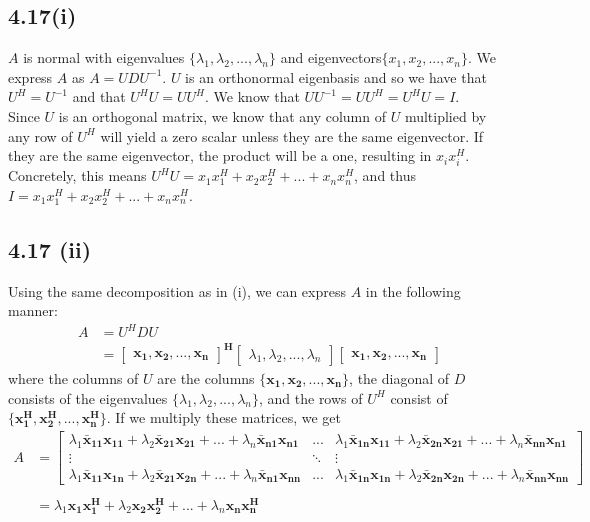 \documentclass[letterpaper,12pt]{article}
\theoremstyle{definition}
\begin{document}
\subsection*{4.17(i)}
$A$ is normal with eigenvalues $\{\lambda_{1},\lambda_{2},...,\lambda_{n}\}$ and eigenvectors$\{x_{1}, x_{2},..., x_{n}\}$. We express $A$ as $A = UDU^{-1}$. $U$ is an orthonormal eigenbasis and so we have that $U^{H}=U^{-1}$ and that $U^{H}U = UU^{H}$. We know that $UU^{-1} = UU^{H} =  U^{H}U = I$. \\
Since $U$ is an orthogonal matrix, we know that any column of $U$ multiplied by any row of $U^H$ will yield a zero scalar unless they are the same eigenvector. If they are the same eigenvector, the product will be a one, resulting in $x_{i}x_{i}^{H}$. Concretely, this means $U^{H}U = x_{1}x_{1}^{H} + x_{2}x_{2}^{H} + ... + x_{n}x_{n}^{H}$, and thus $I = x_{1}x_{1}^{H} + x_{2}x_{2}^{H} + ... + x_{n}x_{n}^{H}$. \\ 

\subsection*{4.17 (ii)}


Using the same decomposition as in (i), we can express $A$ in the following manner:
\begin{align*}A &= U^HDU\\
& = \begin{bmatrix}
\mathbf{x_1, x_2, ..., x_n}\end{bmatrix}^{\mathbf{H}}
\begin{bmatrix}
{\lambda_1, \lambda_2, ..., \lambda_n}
\end{bmatrix}
\begin{bmatrix}
\mathbf{x_1, x_2, ..., x_n}\end{bmatrix}
\end{align*}
where the columns of $U$ are the columns $\{\mathbf{x_1, x_2, ..., x_n}\}$, the diagonal of $D$ consists of the eigenvalues $\{\lambda_1, \lambda_2, ..., \lambda_n\}$, and the rows of $U^H$ consist of $\{\mathbf{x_1^H, x_2^H, ..., x_n^H}\}$. If we multiply these matrices, we get 
\begin{align*} A &= \begin{bmatrix}
\lambda_1\mathbf{\bar{x}_{11}x_{11}} + \lambda_2\mathbf{\bar{x}_{21}x_{21}} +...+ \lambda_n\mathbf{\bar{x}_{n1}x_{n1}} & ... & 
\lambda_1\mathbf{\bar{x}_{1n}x_{11}} + \lambda_2\mathbf{\bar{x}_{2n}x_{21}} +...+\lambda_n\mathbf{\bar{x}_{nn}x_{n1}} \\
\vdots&\ddots&\vdots\\
\lambda_1\mathbf{\bar{x}_{11}x_{1n}} + \lambda_2\mathbf{\bar{x}_{21}x_{2n}} +...+\lambda_n\mathbf{\bar{x}_{n1}x_{nn}} & ... &
\lambda_1\mathbf{\bar{x}_{1n}x_{1n}} + \lambda_2\mathbf{\bar{x}_{2n}x_{2n}} +...+ \lambda_n\mathbf{\bar{x}_{nn}x_{nn}} 
\end{bmatrix}\\
\\
&= \lambda_1 \mathbf{x_1x_1^H} + \lambda_2 \mathbf{x_2x_2^H} + ... + \lambda_n \mathbf{x_nx_n^H}
\end{align*}
\end{document}
